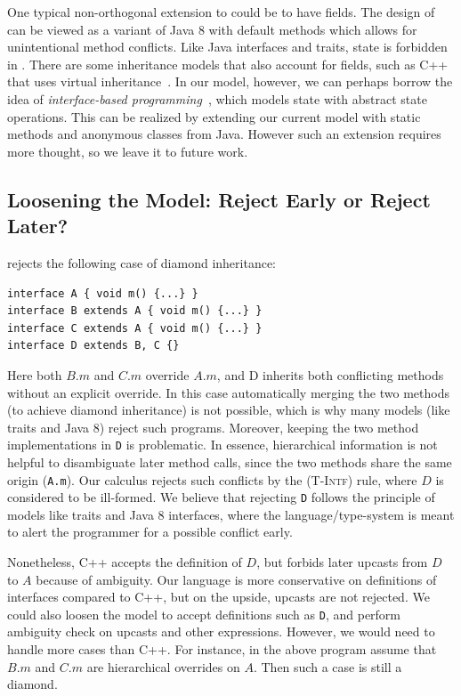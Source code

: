 One typical non-orthogonal extension to \MIM{} could be to have fields.
The design of \MIM{} can be viewed as a variant of Java 8 with default methods which allows for unintentional method conflicts.
Like Java interfaces and traits, state is forbidden in \MIM{}. There are some inheritance models that also account for fields, such as C++ that uses virtual inheritance~\cite{ellis1990annotated}. In our model, however, we can perhaps borrow the idea of \textit{interface-based programming}~\cite{classless}, which models state with abstract state operations. This can be realized by extending our current model with static methods and anonymous classes from Java. However such an extension requires more thought, so we leave it to future work.

\subsection{Loosening the Model: Reject Early or Reject Later?}\label{subsec:loosen}

\MIM{} rejects the following case of diamond inheritance:
\begin{lstlisting}
interface A { void m() {...} }
interface B extends A { void m() {...} }
interface C extends A { void m() {...} }
interface D extends B, C {}
\end{lstlisting}
Here both $B.m$ and $C.m$ override $A.m$, and D inherits
both conflicting methods without an explicit override. In this case automatically merging 
the two methods (to achieve diamond inheritance) is not possible, which is why many 
models (like traits and Java 8) reject such programs. Moreover, keeping the two 
method implementations in \lstinline|D| is problematic. 
In essence, hierarchical information is 
not helpful to disambiguate later method calls, since the two methods share 
the same origin (\lstinline|A.m|). 
Our calculus rejects such conflicts by the \textsc{(T-Intf)} rule, where $D$ is considered to be ill-formed. 
We believe that rejecting \lstinline|D| follows the principle of models like traits and Java 8 interfaces, 
where the language/type-system is meant to alert the programmer for a possible conflict early.

Nonetheless,
 C++ accepts the definition of $D$, but forbids later upcasts from $D$ to $A$ because of ambiguity. Our language is more conservative on definitions of interfaces compared to C++, but on the upside, upcasts are not rejected. We could also loosen the model to accept definitions such as \lstinline|D|, and perform ambiguity check on upcasts and other expressions. However, we would need to handle more cases than C++. For instance, in the above program assume that $B.m$ and $C.m$ are hierarchical overrides on $A$. Then such a case is still a diamond.

